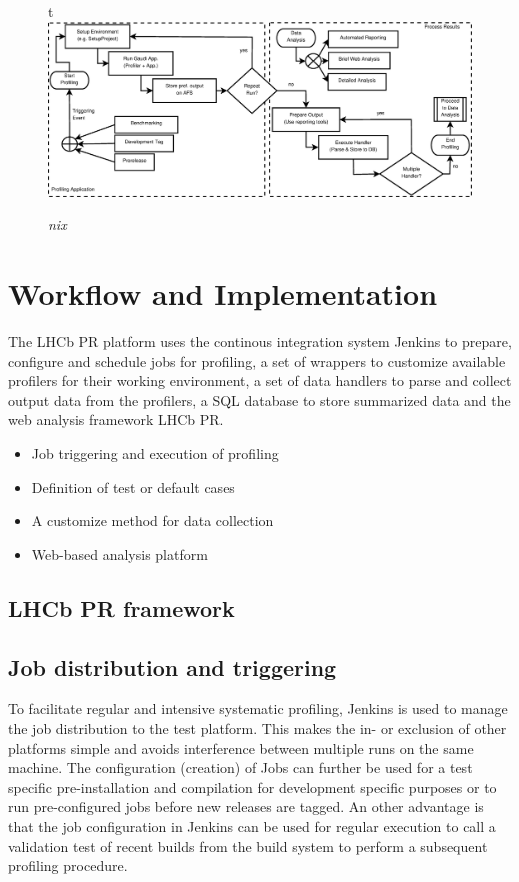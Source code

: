\documentclass[a4paper]{jpconf}
\begin{document}
\newpage

\begin{figure}{t}
\includegraphics[scale=0.3]{figures/profiling_process.eps}
\caption{\small \textit{nix}}
\label{fig:trend}
\end{figure}

\section{Workflow and Implementation}
\label{sec:workflow_and_implementation}

The LHCb PR platform uses the continous integration system Jenkins \cite{jenkins} to prepare, configure and schedule jobs for profiling, a set of wrappers to customize available profilers for their working environment, a set of data handlers to parse and collect output data from the profilers, a SQL database to store summarized data and the web analysis framework LHCb PR. 

\begin{itemize}
 \item Job triggering and execution of profiling
 \item Definition of test or default cases
 \item A customize method for data collection
 \item Web-based analysis platform
\end{itemize}

\subsection{LHCb PR framework}
\label{sec:lhcbpr_framework}

\subsection{Job distribution and triggering}
\label{sec:job_distribution}

To facilitate regular and intensive systematic profiling, Jenkins is used to manage the job distribution to the test platform. This makes the in- or exclusion of other platforms simple and avoids interference between multiple runs on the same machine. The configuration (creation) of Jobs can further be used for a test specific pre-installation and compilation for development specific purposes or to run pre-configured jobs before new releases are tagged.
\newline
An other advantage is that the job configuration in Jenkins can be used for regular execution to call a validation test of recent builds from the build system to perform a subsequent profiling procedure.  
\end{document}
